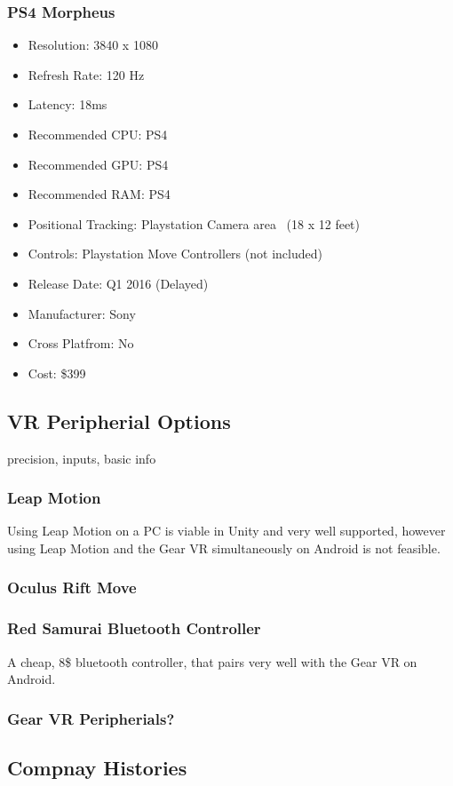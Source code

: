\documentclass[a4paper,10pt]{article}
\begin{document}
\subsubsection{PS4 Morpheus}
\begin{itemize}
  \item Resolution: 3840 x 1080
  \item Refresh Rate: 120 Hz
  \item Latency: 18ms
  \item Recommended CPU: PS4
  \item Recommended GPU: PS4
  \item Recommended RAM: PS4
  \item Positional Tracking: Playstation Camera area ~(18 x 12 feet)
  \item Controls: Playstation Move Controllers (not included)
  \item Release Date: Q1 2016 (Delayed)
  \item Manufacturer: Sony
  \item Cross Platfrom: No
  \item Cost: \$399
\end{itemize}
	
\pagebreak
\subsection{VR Peripherial Options}
precision, inputs, basic info
\subsubsection{Leap Motion}
	Using Leap Motion on a PC is viable in Unity and very well supported, however using Leap Motion and the Gear VR simultaneously on Android is not feasible.
\subsubsection{Oculus Rift Move}
\subsubsection{Red Samurai Bluetooth Controller}
	A cheap, 8\$ bluetooth controller, that pairs very well with the Gear VR on Android.
\subsubsection{Gear VR Peripherials?}
\pagebreak
\subsection{Compnay Histories}
\end{document}
